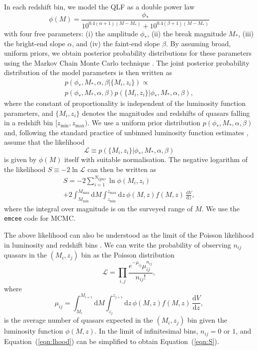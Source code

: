 \documentclass[fleqn,usenatbib]{mnras}
\begin{document}
In each redshift bin, we model the QLF as a double power law
\citep[e.g.][]{1988MNRAS.235..935B}
\begin{equation}
  \phi(M) =
  \frac{\phi_*}{10^{0.4(\alpha+1)(M-M_*)}+10^{0.4(\beta+1)(M-M_*)}}
  \label{eqn:dpl}
\end{equation}
with four free parameters: (i) the amplitude $\phi_*$, (ii) the break
magnitude $M_*$, (iii) the bright-end slope $\alpha$, and (iv) the
faint-end slope $\beta$.  By assuming broad, uniform priors, we obtain
posterior probability distributions for these parameters using the
Markov Chain Monte Carlo technique \citep[MCMC, e.g.,][]{jaynes}.  The
joint posterior probability distribution of the model parameters is
then written as
\begin{multline}
  p(\phi_*, M_*, \alpha, \beta | \{M_i, z_i\}) \propto \\ p(\phi_*, M_*,
  \alpha, \beta)p(\{M_i, z_i\} | \phi_*, M_*, \alpha, \beta),
\end{multline}
where the constant of proportionality is independent of the luminosity
function parameters, and $\{M_i, z_i\}$ denotes the magnitudes and
redshifts of quasars falling in a redshift bin $[z_\mathrm{min},
  z_\mathrm{max})$.  We use a uniform prior distribution $p(\phi_*,
  M_*, \alpha, \beta)$ and, following the standard practice of
  unbinned luminosity function estimates
  \citep[e.g.,][]{2001AJ....121...54F}, assume that the likelihood
\begin{equation}
  \mathcal{L}\equiv p(\{M_i, z_i\} | \phi_*, M_*, \alpha, \beta)
\end{equation}
is given by $\phi(M)$ itself with suitable normalisation.  The
negative logarithm of the likelihood $S\equiv -2\ln\mathcal{L}$ can
then be written as
\begin{multline}
  S = -2\sum_{i=1}^{N_\mathrm{QSO}}\ln\phi(M_i, z_i)\\+2\int_{M_\mathrm{min}}^{M_\mathrm{max}}\mathrm{d}M
  \int_{z_\mathrm{min}}^{z_\mathrm{max}}\mathrm{d}z\, \phi(M,z) f(M, z)\,\frac{\mathrm{d}V}{\mathrm{d}z},
  \label{eqn:S}
\end{multline}
where the integral over magnitude is on the surveyed range of $M$.  We
use the \texttt{emcee} code \citep{2013PASP..125..306F} for MCMC.


The above likelihood can also be understood as the limit of the
Poisson likelihood in luminosity and redshift bins
\citep{1983ApJ...269...35M, 2001AJ....121...54F}.  We can write the
probability of observing $n_{ij}$ quasars in the $(M_i, z_j)$ bin as
the Poisson distribution
\begin{equation}
  \mathcal{L}=\prod_{i,j}\frac{e^{-\mu_{ij}}\mu_{ij}^{n_{ij}}}{n_{ij}!},
  \label{eqn:lhood}
\end{equation}
where 
\begin{equation}
  \mu_{ij}= \int_{M_i}^{M_{i+1}}\mathrm{d}M\int_{z_j}^{z_{j+1}}\mathrm{d}z\, \phi(M,z) f(M, z)
  \,\frac{\mathrm{d}V}{\mathrm{d}z},
\end{equation}
is the average number of quasars expected in the $(M_i, z_j)$ bin
given the luminosity function $\phi(M,z)$.  In the limit of
infinitesimal bins, $n_{ij}=0$ or $1$, and Equation~(\ref{eqn:lhood})
can be simplified to obtain Equation~(\ref{eqn:S}).
\end{document}
